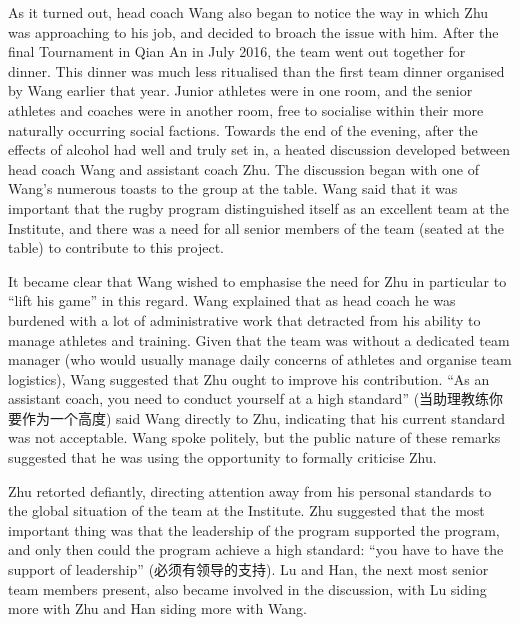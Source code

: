 \begin{CJK}{UTF8}{gbsn}
As it turned out, head coach Wang also began to notice the way in which Zhu was approaching to his job, and decided to broach the issue with him.  After the final Tournament in Qian An in July 2016, the team went out together for dinner.  This dinner was much less ritualised than the first team dinner organised by Wang earlier that year.  Junior athletes were in one room, and the senior athletes and coaches were in another room, free to socialise within their more naturally occurring social factions.  Towards the end of the evening, after the effects of alcohol had well and truly set in, a heated discussion developed between head coach Wang and assistant coach Zhu. The discussion began with one of Wang's numerous toasts to the group at the table.  Wang said that it was important that the rugby program distinguished itself as an excellent team at the Institute, and there was a need for all senior members of the team (seated at the table) to contribute to this project.

It became clear that Wang wished to emphasise the need for Zhu in particular to ``lift his game'' in this regard. Wang explained that as head coach he was burdened with a lot of administrative work that detracted from his ability to manage athletes and training.  Given that the team was without a dedicated team manager (who would usually manage daily concerns of athletes and organise team logistics), Wang suggested that Zhu ought to improve his contribution. ``As an assistant coach, you need to conduct yourself at a high standard'' (当助理教练你要作为一个高度) said Wang directly to Zhu, indicating that his current standard was not acceptable. Wang spoke politely, but the public nature of these remarks suggested that he was using the opportunity to formally criticise Zhu.

Zhu retorted defiantly, directing attention away from his personal standards to the global situation of the team at the Institute.  Zhu suggested that the most important thing was that the leadership of the program supported the program, and only then could the program achieve a high standard: ``you have to have the support of leadership'' (必须有领导的支持).  Lu and Han, the next most senior team members present, also became involved in the discussion, with Lu siding more with Zhu and Han siding more with Wang.


\end{CJK}
